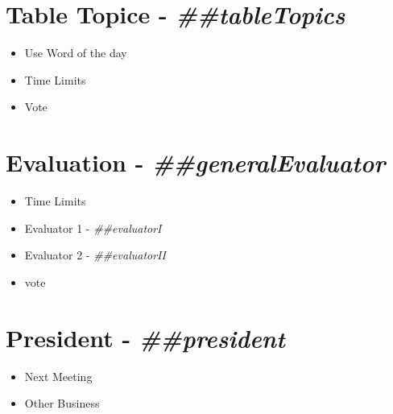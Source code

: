 \documentclass{article}
\newcommand{\president}{##president}
\newcommand{\tableTopics}{##tableTopics}
\newcommand{\generalEvaluator}{##generalEvaluator}
\newcommand{\evaluatorI}{##evaluatorI}
\newcommand{\evaluatorII}{##evaluatorII}
\begin{document}
\section*{Table Topice - \textit{\tableTopics{}}} 
\begin{itemize}
 \item Use Word of the day
 \item Time Limits
 \item Vote
\end{itemize}

\section*{Evaluation - \textit{\generalEvaluator{}}} 
\begin{itemize}
  \item Time Limits
  \item Evaluator 1 - \textit{\evaluatorI{}}
  \item Evaluator 2 - \textit{\evaluatorII{}}
  \item vote
\end{itemize}


\section*{President - \textit{\president{}}} 
\begin{itemize}
  \item Next Meeting
  \item Other Business
\end{itemize}
\end{document}
